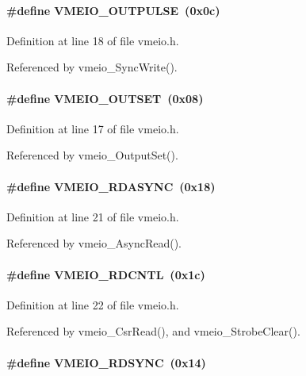 \paragraph[{VMEIO\_\-OUTPULSE}]{\setlength{\rightskip}{0pt plus 5cm}\#define VMEIO\_\-OUTPULSE~(0x0c)}\hfill\label{vmeio_8h_a34b4c81af322b21b3f39c63755195d72}


Definition at line 18 of file vmeio.h.

Referenced by vmeio\_\-SyncWrite().
\paragraph[{VMEIO\_\-OUTSET}]{\setlength{\rightskip}{0pt plus 5cm}\#define VMEIO\_\-OUTSET~(0x08)}\hfill\label{vmeio_8h_a614e293a518fc11cb02d90528a24ba7a}


Definition at line 17 of file vmeio.h.

Referenced by vmeio\_\-OutputSet().
\paragraph[{VMEIO\_\-RDASYNC}]{\setlength{\rightskip}{0pt plus 5cm}\#define VMEIO\_\-RDASYNC~(0x18)}\hfill\label{vmeio_8h_a865b434179015dacce518a05efb48f25}


Definition at line 21 of file vmeio.h.

Referenced by vmeio\_\-AsyncRead().
\paragraph[{VMEIO\_\-RDCNTL}]{\setlength{\rightskip}{0pt plus 5cm}\#define VMEIO\_\-RDCNTL~(0x1c)}\hfill\label{vmeio_8h_a54026a9829f628294928fbfedb2e122f}


Definition at line 22 of file vmeio.h.

Referenced by vmeio\_\-CsrRead(), and vmeio\_\-StrobeClear().
\paragraph[{VMEIO\_\-RDSYNC}]{\setlength{\rightskip}{0pt plus 5cm}\#define VMEIO\_\-RDSYNC~(0x14)}\hfill\label{vmeio_8h_aad6f81a74d62f75ca392c908cb3fc3c6}


